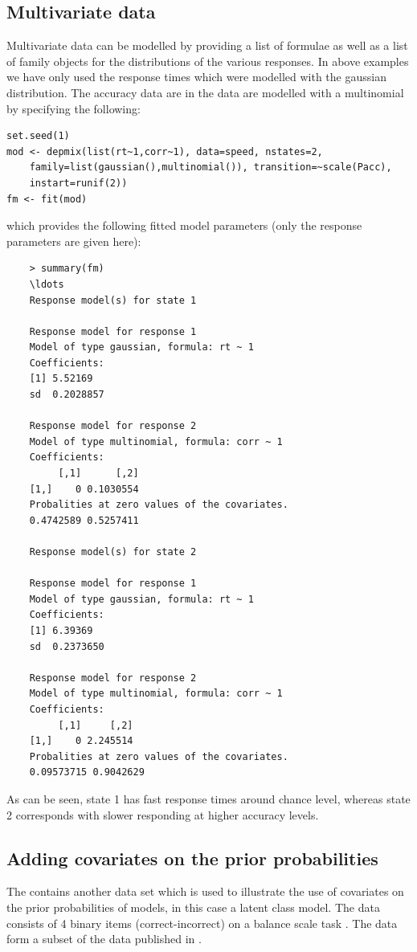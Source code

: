 \documentclass[article]{jss}
\begin{document}
\subsection{Multivariate data}

Multivariate data can be modelled by providing a list of formulae as 
well as a list of family objects for the distributions of the various 
responses. In above examples we have only used the response times 
which were modelled with the gaussian distribution. The accuracy data 
are in the  data are modelled with a multinomial by 
specifying the following: 
\begin{verbatim}
set.seed(1)
mod <- depmix(list(rt~1,corr~1), data=speed, nstates=2, 
	family=list(gaussian(),multinomial()), transition=~scale(Pacc), 
	instart=runif(2))
fm <- fit(mod)
\end{verbatim}
which provides the following fitted model parameters (only the 
response parameters are given here): 
\begin{verbatim}
	> summary(fm)
	\ldots 
	Response model(s) for state 1 

	Response model for response 1 
	Model of type gaussian, formula: rt ~ 1
	Coefficients: 
	[1] 5.52169
	sd  0.2028857 

	Response model for response 2 
	Model of type multinomial, formula: corr ~ 1
	Coefficients: 
		 [,1]      [,2]
	[1,]    0 0.1030554
	Probalities at zero values of the covariates.
	0.4742589 0.5257411 

	Response model(s) for state 2 

	Response model for response 1 
	Model of type gaussian, formula: rt ~ 1
	Coefficients: 
	[1] 6.39369
	sd  0.2373650 

	Response model for response 2 
	Model of type multinomial, formula: corr ~ 1
	Coefficients: 
		 [,1]     [,2]
	[1,]    0 2.245514
	Probalities at zero values of the covariates.
	0.09573715 0.9042629 	
\end{verbatim}
As can be seen, state 1 has fast response times around chance level, 
whereas state 2 corresponds with slower responding at higher accuracy 
levels. 


\subsection{Adding covariates on the prior probabilities}

The  contains another data set which is used to
illustrate the use of covariates on the prior probabilities of models,
in this case a latent class model. The  data consists 
of 4 binary items (correct-incorrect) on a balance scale task 
\citet{Siegler1981}. The data form a subset of the data published in 
\citet{Jansen2002}. 
\end{document}
